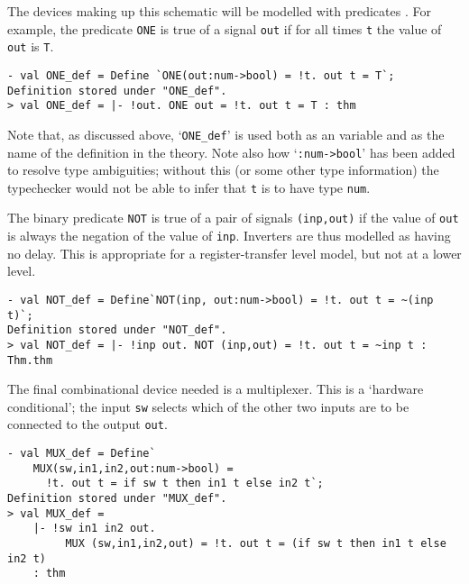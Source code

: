 The devices making up this schematic will be modelled with predicates
\cite{Why-HOL-paper}. For example, the predicate {\small\verb|ONE|} is true
of a signal {\small\verb|out|} if for all times {\small\verb|t|} the value of
{\small\verb|out|} is {\small\verb|T|}.

\begin{session}
\begin{verbatim}
- val ONE_def = Define `ONE(out:num->bool) = !t. out t = T`;
Definition stored under "ONE_def".
> val ONE_def = |- !out. ONE out = !t. out t = T : thm
\end{verbatim}
\end{session}

\noindent Note that, as discussed above, `{\small\verb|ONE_def|}'  is used both
as an \ML{} variable and as the name of the definition in the theory.
Note also how `{\small\verb|:num->bool|}' has been added to resolve
type ambiguities; without this (or some other type information) the
typechecker would not be able to infer that {\small\tt t} is to have
type {\small\tt num}.

The binary predicate {\small\verb|NOT|} is true of a pair of signals
{\small\verb|(inp,out)|} if the value of {\small\verb|out|} is always
the negation of the value of {\small\verb|inp|}. Inverters are thus
modelled as having no delay. This is appropriate for a
register-transfer level model, but not at a lower level.

\begin{session}
\begin{verbatim}
- val NOT_def = Define`NOT(inp, out:num->bool) = !t. out t = ~(inp t)`;
Definition stored under "NOT_def".
> val NOT_def = |- !inp out. NOT (inp,out) = !t. out t = ~inp t : Thm.thm
\end{verbatim}
\end{session}

\noindent The final combinational device needed is a multiplexer.
This is a `hardware conditional'; the input
{\small\verb|sw|} selects which of the other
two inputs are to be connected to the output {\small\verb|out|}.

\begin{session}
\begin{verbatim}
- val MUX_def = Define`
    MUX(sw,in1,in2,out:num->bool) =
      !t. out t = if sw t then in1 t else in2 t`;
Definition stored under "MUX_def".
> val MUX_def =
    |- !sw in1 in2 out.
         MUX (sw,in1,in2,out) = !t. out t = (if sw t then in1 t else in2 t)
    : thm
\end{verbatim}
\end{session}

